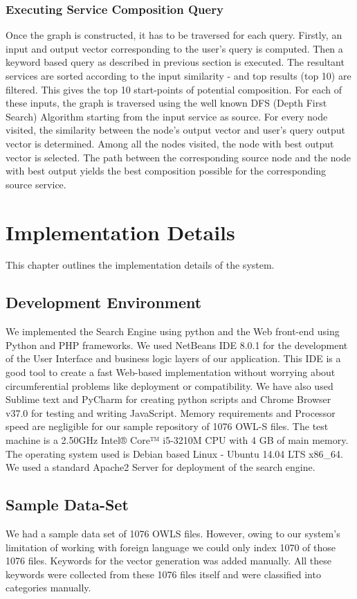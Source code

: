 \documentclass[12pt, oneside]{book}
\begin{document}
\subsection{Executing Service Composition Query}
Once the graph is constructed, it has to be traversed for each query. Firstly, an input and output vector corresponding to the user's query is computed. Then a keyword based query as described in previous section is executed. The resultant services are sorted according to the input similarity - and top results (top 10) are filtered. This gives the top 10 start-points of potential composition. For each of these inputs, the graph is traversed using the well known DFS (Depth First Search) Algorithm starting from the input service as source. For every node visited, the similarity between the node's output vector and user's query output vector is determined. Among all the nodes visited, the node with best output vector is selected. The path between the corresponding source node and the node with best output yields the best composition possible for the corresponding source service.

\chapter{Implementation Details}
This chapter outlines the implementation details of the system.
\section{Development Environment}
We implemented the Search Engine using python and the Web front-end using Python and PHP frameworks. We used  NetBeans IDE 8.0.1 for the development of the User Interface and business logic layers of our  application. This IDE is a good tool to create a fast Web-based implementation without worrying about circumferential problems like deployment or compatibility. We have also used Sublime text and PyCharm for creating python scripts and Chrome Browser v37.0 for testing and writing JavaScript. Memory requirements and Processor speed are negligible for our sample repository of 1076 OWL-S files. The test machine is a 2.50GHz Intel® Core™ i5-3210M CPU with 4 GB of main memory. The operating system used is Debian based Linux - Ubuntu 14.04 LTS x86\_64. We used a standard Apache2 Server for deployment of the search engine.
\section{Sample Data-Set}
We had a sample data set of 1076 OWLS files. However, owing to our system's limitation of working with foreign language we could only index 1070 of those 1076 files. Keywords for the vector generation was added manually. All these keywords were collected from these 1076 files itself and were classified into categories manually.
\end{document}
